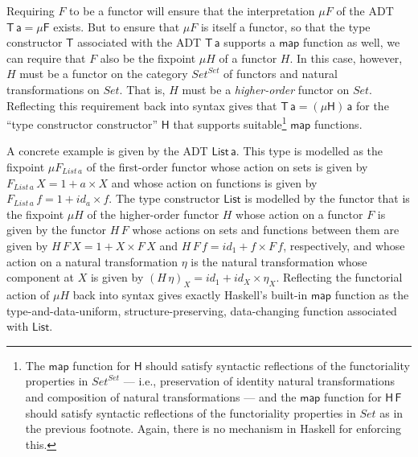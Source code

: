 \documentclass[acmsmall,screen,review,anonymous]{acmart}
\theoremstyle{definition}
\renewcommand{\id}{\mathit{id}}
\begin{document}
Requiring $F$ to be a functor will ensure that the interpretation $\mu
F$ of the ADT $\mathsf{T\,a} = \mathsf{\mu F}$ exists. But to ensure
that $\mu F$ is itself a functor, so that the type constructor
$\mathsf{T}$ associated with the ADT $\mathsf{T\,a}$ supports a
$\mathsf{map}$ function as well, we can require that $F$ also be the
fixpoint $\mu H$ of a functor $H$. In this case, however, $H$ must be
a functor on the category $\mathit{Set}^\mathit{Set}$ of functors and
natural transformations on $\mathit{Set}$. That is, $H$ must be a {\em
  higher-order} functor on $\mathit{Set}$. Reflecting this requirement
back into syntax gives that
$\mathsf{T\,a} = \mathsf{(\mu H)\,a}$
for the ``type constructor constructor''
$\mathsf{H}$ that supports suitable\footnote{The $\mathsf{map}$
  function for $\mathsf{H}$ should satisfy syntactic reflections of
  the functoriality properties in $\mathit{Set}^\mathit{Set}$ ---
  i.e., preservation of identity natural transformations and
  composition of natural transformations --- and the $\mathsf{map}$
  function for $\mathsf{H\,F}$ should satisfy syntactic reflections of
  the functoriality properties in $\mathit{Set}$ as in the previous
  footnote. Again, there is no mechanism in Haskell for enforcing
  this.} $\mathsf{map}$ functions. 

%
       
      
A concrete example is given by the ADT $\mathsf{List\,a}$. This type
is modelled as the fixpoint $\mu F_{\mathit{List\,a}}$ of the
first-order functor whose action on sets is given by
$F_{\mathit{List}\,a}\,X = 1 + a \times X$ and whose action on
functions is given by $F_{\mathit{List}\,a}\,f = 1 + \id_a \times
f$. The type constructor $\mathsf{List}$ is modelled by the functor
that is the fixpoint $\mu H$ of the higher-order functor $H$ whose
action on a functor $F$ is given by the functor $H\,F$ whose actions
on sets and functions between them are given by $H\,F\,X = 1 + X
\times F\,X$ and $H\,F\,f = \id_1 + f \times F\,f$, respectively, and
whose action on a natural transformation $\eta$ is the natural
transformation whose component at $X$ is given by $(H\,\eta)_X = \id_1
+ \id_X \times \eta_X$. Reflecting the functorial action of $\mu H$
back into syntax gives exactly Haskell's built-in $\mathsf{map}$
function as the type-and-data-uniform, structure-preserving,
data-changing function associated with $\mathsf{List}$.
\end{document}
